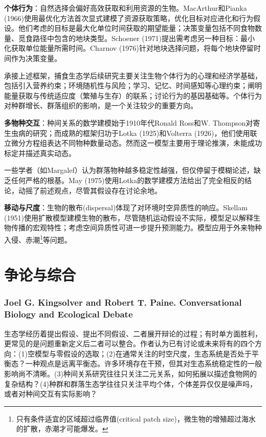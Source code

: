 \textbf{个体行为}：自然选择会偏好高效获取和利用资源的生物。MacArthur和Pianka (1966)使用最优化方法首次显式建模了资源获取策略，优化目标对应进化和行为假设。他们考虑的目标是最大化单位时间获取的期望能量；决策变量包括不同食物数量、觅食路径中包含的地块类型。Schoener (1971)提出需考虑另一种目标：最小化获取单位能量所需时间。Charnov (1976)针对地块选择问题，将每个地块停留时间作为决策变量。 

承接上述框架，捕食生态学后续研究主要关注生物个体行为的心理和经济学基础，包括引入营养约束；环境随机性与风险；学习、记忆、时间感知等心理约束；阐明能量获取与传统适应度（繁殖与生存）的联系；讨论行为的基因基础等。个体行为对种群增长、群落组织的影响，是一个关注较少的重要方向。

\textbf{多物种交互}：种间关系的数学建模始于1910年代Ronald Ross和W. Thompson对寄生虫病的研究；而成熟的框架归功于Lotka (1925)和Volterra (1926)，他们使用联立微分方程组表达不同物种数量动态。然而这一模型主要用于理论推演，未能成功标定并描述真实动态。

一些学者（如Margalef）认为群落物种越多稳定性越强，但仅停留于模糊论述，缺乏任何严格的根基。May (1975)使用Lotka的数学建模方法给出了完全相反的结论，动摇了前述观点，尽管其假设存在讨论余地。

\textbf{移动与尺度}：生物的散布(dispersal)体现了对环境时空异质性的响应。Skellam (1951)使用扩散模型建模生物的散布，尽管随机运动假设不实际，模型足以解释生物传播的宏观特性；考虑空间异质性可进一步提升预测能力。模型应用于外来物种入侵、赤潮\footnote{只有条件适宜的区域超过临界值(critical patch size)，微生物的增殖超过海水的扩散，赤潮才可能爆发。}等问题。

\section{争论与综合}

\subsubsection*{Joel G. Kingsolver and Robert T. Paine. Conversational Biology and Ecological Debate}

生态学经历着提出假设、提出不同假设、二者展开辩论的过程；有时单方面胜利，更常见的是问题重新定义后二者可以整合。作者认为已有讨论或未来将有的四个方向：(1)空模型与零假设的选取；(2)在通常关注的时空尺度，生态系统是否处于平衡态？一种观点是远离平衡态。许多环境存在干预，但其对生态系统稳定性的一般影响尚不清晰。(3)种间关系研究往往只关注二元关系，如何拓展以描述食物网的复杂结构？(4)种群和群落生态学往往只关注平均个体，个体差异仅仅是噪声吗，或者对种间交互有实际影响？

